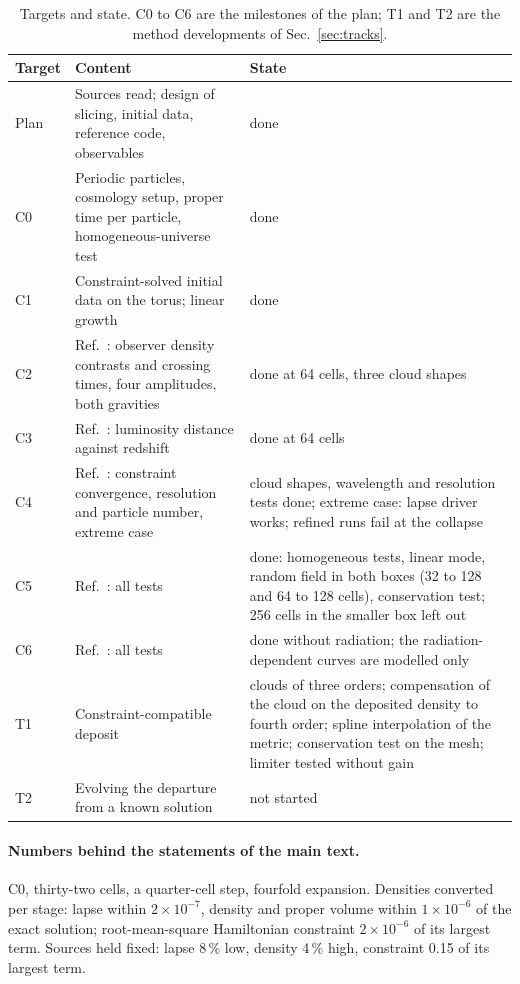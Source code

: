 \documentclass[aps,prd,twocolumn,10pt,superscriptaddress,nofootinbib,longbibliography,floatfix]{revtex4-2}
\begin{document}
\begin{table}[t]
\caption{Targets and state. C0 to C6 are the milestones of the plan; T1 and T2 are the method developments of Sec.~\ref{sec:tracks}.}
\label{tab:ledger}
\begin{ruledtabular}
\begin{tabular}{l p{} p{}}
Target & Content & State \\
\hline
Plan & Sources read; design of slicing, initial data, reference code, observables & done \\
C0 & Periodic particles, cosmology setup, proper time per particle, homogeneous-universe test & done \\
C1 & Constraint-solved initial data on the torus; linear growth & done \\
C2 & Ref.~\cite{East:2019chx}: observer density contrasts and crossing times, four amplitudes, both gravities & done at 64 cells, three cloud shapes \\
C3 & Ref.~\cite{East:2019chx}: luminosity distance against redshift & done at 64 cells \\
C4 & Ref.~\cite{East:2019chx}: constraint convergence, resolution and particle number, extreme case & cloud shapes, wavelength and resolution tests done; extreme case: lapse driver works; refined runs fail at the collapse \\
C5 & Ref.~\cite{Daverio:2019gql}: all tests & done: homogeneous tests, linear mode, random field in both boxes (32 to 128 and 64 to 128 cells), conservation test; 256 cells in the smaller box left out \\
C6 & Ref.~\cite{Barrera-Hinojosa:2020arz}: all tests & done without radiation; the radiation-dependent curves are modelled only \\
T1 & Constraint-compatible deposit & clouds of three orders; compensation of the cloud on the deposited density to fourth order; spline interpolation of the metric; conservation test on the mesh; limiter tested without gain \\
T2 & Evolving the departure from a known solution & not started \\
\end{tabular}
\end{ruledtabular}
\end{table}

\paragraph*{Numbers behind the statements of the main text.}
C0, thirty-two cells, a quarter-cell step, fourfold expansion. Densities converted per stage: lapse within $2\times10^{-7}$, density and proper volume within $1\times10^{-6}$ of the exact solution; root-mean-square Hamiltonian constraint $2\times10^{-6}$ of its largest term. Sources held fixed: lapse 8\,\% low, density 4\,\% high, constraint 0.15 of its largest term.
\end{document}
